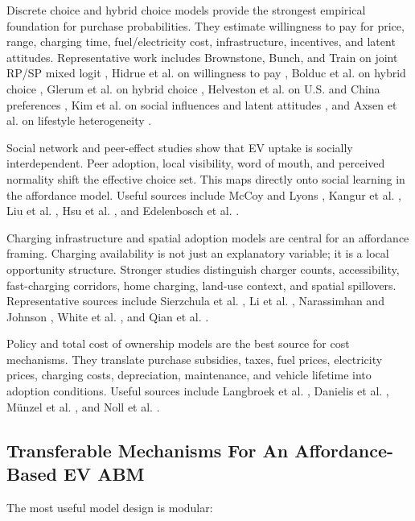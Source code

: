 \documentclass[11pt]{article} %
\begin{document}
Discrete choice and hybrid choice models provide the strongest empirical
foundation for purchase probabilities. They estimate willingness to pay for
price, range, charging time, fuel/electricity cost, infrastructure, incentives,
and latent attitudes. Representative work includes Brownstone, Bunch, and Train
on joint RP/SP mixed logit \cite{brownstone2000}, Hidrue et al. on willingness
to pay \cite{hidrue2011}, Bolduc et al. on hybrid choice
\cite{bolduc2008}, Glerum et al. on hybrid choice \cite{glerum2014},
Helveston et al. on U.S. and China preferences \cite{helveston2015}, Kim et
al. on social influences and latent attitudes \cite{kim2014}, and Axsen et al.
on lifestyle heterogeneity \cite{axsen2015}.

Social network and peer-effect studies show that EV uptake is socially
interdependent. Peer adoption, local visibility, word of mouth, and perceived
normality shift the effective choice set. This maps directly onto social
learning in the affordance model. Useful sources include
McCoy and Lyons \cite{mccoy2014}, Kangur et al. \cite{kangur2017}, Liu et al.
\cite{liu2017}, Hsu et al. \cite{hsu2013}, and Edelenbosch et al.
\cite{edelenbosch2018}.

Charging infrastructure and spatial adoption models are central for an
affordance framing. Charging availability is not just an explanatory variable;
it is a local opportunity structure. Stronger studies distinguish charger
counts, accessibility, fast-charging corridors, home charging, land-use context,
and spatial spillovers. Representative sources include
Sierzchula et al. \cite{sierzchula2014}, Li et al. \cite{li2017},
Narassimhan and Johnson \cite{narassimhan2018}, White et al.
\cite{white2022}, and Qian et al. \cite{qian2024}.

Policy and total cost of ownership models are the best source for cost
mechanisms. They translate purchase subsidies, taxes, fuel prices, electricity
prices, charging costs, depreciation, maintenance, and vehicle lifetime into
adoption conditions. Useful sources include
Langbroek et al. \cite{langbroek2016}, Danielis et al.
\cite{danielis2018}, M\"{u}nzel et al. \cite{munzel2019}, and Noll et al.
\cite{noll2024}.

\subsection{Transferable Mechanisms For An Affordance-Based EV ABM}

The most useful model design is modular:
\end{document}
